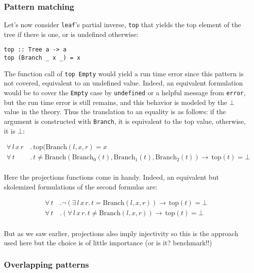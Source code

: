 \subsubsection{Pattern matching}

Let's now consider \verb;leaf;'s partial inverse, \verb;top; that
yields the top element of the tree if there is one, or is undefined
otherwise:

\begin{verbatim}
top :: Tree a -> a
top (Branch _ x _) = x
\end{verbatim}

The function call of \verb;top Empty; would yield a run time error
since this pattern is not covered, equivalent to an undefined
value. Indeed, an equivalent formulation would be to cover the
\verb;Empty; case by \verb;undefined; or a helpful message from
\verb;error;, but the run time error is still remains, and this
behavior is modeled by the $\bot$ value in the theory. Thus the
translation to an equality is as follows: if the argument is
constructed with \verb;Branch;, it is equivalent to the top value,
otherwise, it is $\bot$:

\begin{align*}
 \forall \, l \, x \, r \, & . \, \mathrm{top}(\mathrm{Branch}(l,x,r) = x\\
 \forall \, t \, & . \, t \neq
 \mathrm{Branch}(\mathrm{Branch_{0}}(t),\mathrm{Branch_{1}}(t),\mathrm{Branch_{2}}(t))
 \rightarrow \, \mathrm{top}(t)  = \mathrm{\bot}\\
\end{align*}

Here the projections functions come in handy. Indeed, an equivalent
but skolemized formulations of the second formulas are:

\begin{align*}
 \forall \, t \, & . \neg (\exists \, l \, x \, r . \, t =
 \mathrm{Branch}(l,x,r))
 \rightarrow \, \mathrm{top}(t) = \bot \\
 \forall \, t \, & . (\forall \, l \, x \, r . \, t \neq
 \mathrm{Branch}(l,x,r))
 \rightarrow \, \mathrm{top}(t) = \bot \\
\end{align*}

But as we saw earlier, projections also imply injectivity so this is
the approach used here but the choice is of little importance (or is
it? benchmark!!)

\subsubsection{Overlapping patterns}

